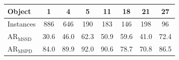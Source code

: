\begin{tabular}{@{}l ccccccc@{}}
\toprule
Object & 1 & 4 & 5 & 11 & 18 & 21 & 27 \\
\midrule
Instances & 886 & 646 & 190 & 183 & 146 & 198 & 96 \\
AR$_\text{MSSD}$ & 30.6 & 46.0 & 62.3 & 50.9 & 59.6 & 41.0 & 72.4 \\
AR$_\text{MSPD}$ & 84.0 & 89.9 & 92.0 & 90.6 & 78.7 & 70.8 & 86.5 \\
\bottomrule
\end{tabular}
